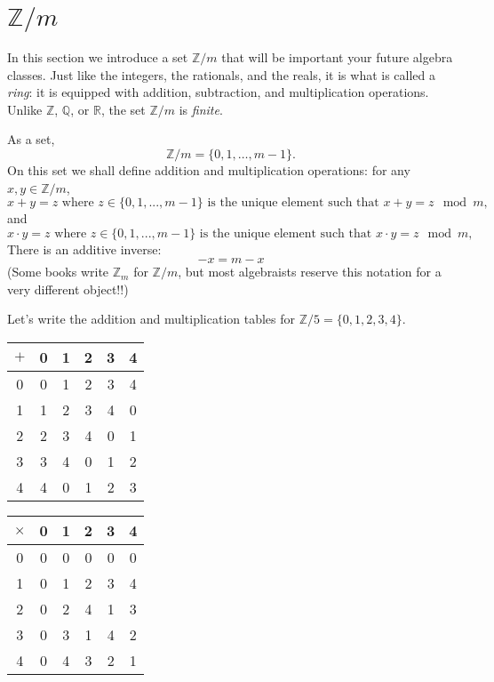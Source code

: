 \documentclass[11pt,dvipsnames]{book}
\numberwithin{figure}{section} %
\numberwithin{table}{section} %
\begin{document}
\section{$\mathbb{Z}/m$}%
\label{Zmodm}

In this section we introduce a set $\mathbb{Z}/m$ that will be important your future algebra classes.
Just like the integers, the rationals, and the reals, it is what is called a \emph{ring}: it is equipped with addition, subtraction, and multiplication operations.
Unlike $\mathbb{Z}$, $\mathbb{Q}$, or $\mathbb{R}$, the set $\mathbb{Z}/m$ is {\it finite}.

As a set,
\[
\mathbb{Z}/m=\{0,1,\dots,m-1\}.
\]
On this set we shall define addition and multiplication operations: for any $x,y \in \mathbb{Z}/m$,
\[
x + y = z \mbox{ where $z\in \{0,1,...,m-1\}$ is the unique element such that } x + y = z\mod m,
\]
and
\[
x \cdot y = z \mbox{ where $z\in \{0,1,...,m-1\}$ is the unique element such that } x \cdot y = z\mod m,
\]
There is an additive inverse:
\[
- x = m-x
\]
(Some books write $\mathbb{Z}_m$ for $\mathbb{Z}/m$, but most algebraists reserve this notation for a very different object!!)

\begin{example}
Let's write the addition and multiplication tables for $\mathbb{Z}/5=\{0,1,2,3,4\}$.

\begin{center}
\begin{tabular}{| c| c | c | c | c | c |}
\hline
{$+$} & {0} & {1} & {2} & {3} & {4}\\
\hline
{0} & {0} & {1} & {2} & {3} & {4} \\
\hline
{1} & {1} & {2} & {3} & {4} & {0} \\
\hline
{2} & {2} & {3} & {4} & {0} & {1} \\
\hline
{3} & {3} & {4} & {0} & {1} & {2} \\
\hline
{4} & {4} & {0} & {1} & {2} & {3} \\
\hline
\end{tabular}

\smallskip

\begin{tabular}{| c| c | c | c | c | c |}
\hline
{$\times$} & {0} & {1} & {2} & {3} & {4}\\
\hline
{0} & {0} & {0} & {0} & {0} & {0} \\
\hline
{1} & {0} & {1} & {2} & {3} & {4} \\
\hline
{2} & {0} & {2} & {4} & {1} & {3} \\
\hline
{3} & {0} & {3} & {1} & {4} & {2} \\
\hline
{4} & {0} & {4} & {3} & {2} & {1} \\
\hline
\end{tabular}
\end{center}
\end{example}
\end{document}
